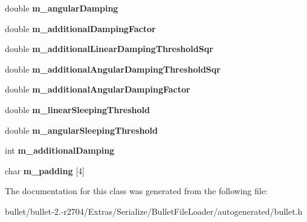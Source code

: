 \begin{DoxyCompactItemize}
\item 
\hypertarget{class_bullet_1_1bt_rigid_body_double_data_a9cae1d40ec98400b53fddc962c7f8787}{double {\bfseries m\+\_\+angular\+Damping}}\label{class_bullet_1_1bt_rigid_body_double_data_a9cae1d40ec98400b53fddc962c7f8787}

\item 
\hypertarget{class_bullet_1_1bt_rigid_body_double_data_a0d77d6f30c1fd75d47c5f10b05256dda}{double {\bfseries m\+\_\+additional\+Damping\+Factor}}\label{class_bullet_1_1bt_rigid_body_double_data_a0d77d6f30c1fd75d47c5f10b05256dda}

\item 
\hypertarget{class_bullet_1_1bt_rigid_body_double_data_a12f392c532191d6be30ce4bafcbd39f1}{double {\bfseries m\+\_\+additional\+Linear\+Damping\+Threshold\+Sqr}}\label{class_bullet_1_1bt_rigid_body_double_data_a12f392c532191d6be30ce4bafcbd39f1}

\item 
\hypertarget{class_bullet_1_1bt_rigid_body_double_data_aeafda15f964b6b0e982aab58ef294ea1}{double {\bfseries m\+\_\+additional\+Angular\+Damping\+Threshold\+Sqr}}\label{class_bullet_1_1bt_rigid_body_double_data_aeafda15f964b6b0e982aab58ef294ea1}

\item 
\hypertarget{class_bullet_1_1bt_rigid_body_double_data_a982e6402a4c0e7009fb1dfe729a000ff}{double {\bfseries m\+\_\+additional\+Angular\+Damping\+Factor}}\label{class_bullet_1_1bt_rigid_body_double_data_a982e6402a4c0e7009fb1dfe729a000ff}

\item 
\hypertarget{class_bullet_1_1bt_rigid_body_double_data_abce77cc963b5a236f3eb8861f1d0823d}{double {\bfseries m\+\_\+linear\+Sleeping\+Threshold}}\label{class_bullet_1_1bt_rigid_body_double_data_abce77cc963b5a236f3eb8861f1d0823d}

\item 
\hypertarget{class_bullet_1_1bt_rigid_body_double_data_a99056999ca7e981a2c01c0329c31c6f0}{double {\bfseries m\+\_\+angular\+Sleeping\+Threshold}}\label{class_bullet_1_1bt_rigid_body_double_data_a99056999ca7e981a2c01c0329c31c6f0}

\item 
\hypertarget{class_bullet_1_1bt_rigid_body_double_data_a8577e43e8e1192781be96ae8c9fa8f11}{int {\bfseries m\+\_\+additional\+Damping}}\label{class_bullet_1_1bt_rigid_body_double_data_a8577e43e8e1192781be96ae8c9fa8f11}

\item 
\hypertarget{class_bullet_1_1bt_rigid_body_double_data_a233c48e654995b7ff2818d8306b212e3}{char {\bfseries m\+\_\+padding} \mbox{[}4\mbox{]}}\label{class_bullet_1_1bt_rigid_body_double_data_a233c48e654995b7ff2818d8306b212e3}

\end{DoxyCompactItemize}


The documentation for this class was generated from the following file\+:\begin{DoxyCompactItemize}
\item 
bullet/bullet-\/2.-\/r2704/\+Extras/\+Serialize/\+Bullet\+File\+Loader/autogenerated/bullet.\+h\end{DoxyCompactItemize}
